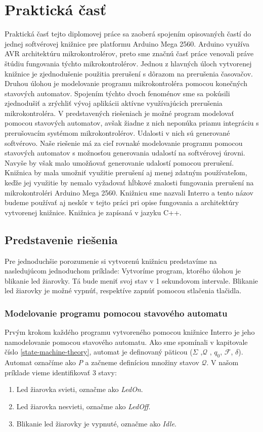 \section{Praktická časť}
\noindent

Praktická časť tejto diplomovej práce sa zaoberá spojením opisovaných častí do jednej softvérovej knižnice pre platformu Arduino Mega 2560. Arduino využíva AVR
architektúru mikrokontrolérov, preto sme značnú časť práce venovali práve štúdiu fungovania týchto mikrokontrolérov.
Jednou z hlavných úloch vytvorenej knižnice je zjednodušenie použitia prerušení s dôrazom na prerušenia časovačov.
Druhou úlohou je modelovanie programu mikrokontroléra pomocou konečných stavových automatov. Spojením týchto dvoch fenoménov sme sa pokúsili zjednodušiť
a zrýchliť vývoj aplikácii aktívne využívajúcich prerušenia mikrokontroléra. V predstavených riešeniach je možné program modelovať pomocou stavových automatov,
avšak žiadne z nich neponúka priamu integráciu s prerušovacím systémom mikrokontrolérov. Udalosti v nich sú generované softvérovo. Naše riešenie má za cieľ rovnaké
modelovanie programu pomocou stavových automatov s možnosťou generovania udalostí na softvérovej úrovni. Navyše by však malo umožňovať generovanie udalostí pomocou
prerušení. Knižnica by mala umožniť využitie  prerušení aj menej zdatným používateľom, keďže jej využitie by nemalo vyžadovať hĺbkové znalosti fungovania prerušení na mikrokontroléri Arduino Mega 2560.
Knižnicu sme nazvali Interro a tento názov budeme používať aj neskôr v tejto práci pri opise fungovania a architektúry vytvorenej knižnice. Knižnica je zapísaná v jazyku C++.

\subsection{Predstavenie riešenia}
\noindent
Pre jednoduchšie porozumenie si vytvorenú knižnicu predstavíme na nasledujúcom jednoduchom príklade: Vytvoríme program, ktorého úlohou je blikanie led žiarovky.
Tá bude meniť svoj stav v 1 sekundovom intervale. Blikanie led žiarovky je možné vypnúť, respektíve zapnúť pomocou stlačenia tlačidla.

\subsubsection{Modelovanie programu pomocou stavového automatu}
\noindent
Prvým krokom každého programu vytvoreného pomocou knižnice Interro je jeho namodelovanie pomocou stavového automatu.
Ako sme spomínali v kapitovale číslo \ref{state-machine-theory}, automat je definovaný päticou ($\Sigma$ ,$\mathcal{Q}$ , $q_0$, $\mathcal{F}$, $\delta$).
Automat označíme ako \textit{P} a začneme definíciou množiny stavov $\mathcal{Q}$. V našom príklade vieme identifikovať 3 stavy:
\begin{enumerate}
    \item Led žiarovka svieti, označme ako \textit{LedOn}.
    \item Led žiarovka nesvieti, označme ako \textit{LedOff}.
    \item Blikanie led žiarovky je vypnuté, označme ako \textit{Idle}.
\end{enumerate}

